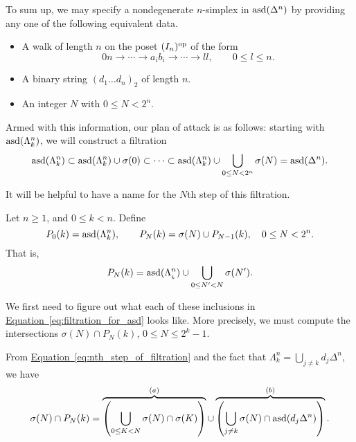 \documentclass[main.tex]{subfiles}
\begin{document}
To sum up, we may specify a nondegenerate $n$-simplex in $\mathrm{asd}(\Delta^{n})$ by providing any one of the following equivalent data.
\begin{itemize}
  \item A walk of length $n$ on the poset $(I_{n})^{\mathrm{op}}$ of the form
    \begin{equation*}
      0n \to \cdots \to a_{i}b_{i} \to \cdots \to ll,\qquad 0 \leq l \leq n.
    \end{equation*}

  \item A binary string $(d_{1}\ldots d_{n})_{2}$ of length $n$.

  \item An integer $N$ with $0 \leq N < 2^{n}$.
\end{itemize}

Armed with this information, our plan of attack is as follows: starting with $\mathrm{asd}(\Lambda^{n}_{k})$, we will construct a filtration
\begin{equation}
  \label{eq:filtration_for_asd}
  \mathrm{asd}(\Lambda^{n}_{k}) \subset \mathrm{asd}(\Lambda^{n}_{k}) \cup \sigma(0) \subset \cdots \subset \mathrm{asd}(\Lambda^{n}_{k}) \cup \bigcup_{0 \leq N < 2^{n}} \sigma(N) = \mathrm{asd}(\Delta^{n}).
\end{equation}

It will be helpful to have a name for the $N$th step of this filtration.

\begin{definition}
  Let $n \geq 1$, and $0 \leq k < n$. Define
  \begin{equation*}
    P_{0}(k) = \mathrm{asd}(\Lambda^{n}_{k}),\qquad P_{N}(k) = \sigma(N) \cup P_{N-1}(k),\quad 0 \leq N < 2^{n}.
  \end{equation*}
  That is,
  \begin{equation}
    \label{eq:nth_step_of_filtration}
    P_{N}(k) = \mathrm{asd}(\Lambda^{n}_{_{k}}) \cup \bigcup_{0 \leq N' < N} \sigma(N').
  \end{equation}
\end{definition}

We first need to figure out what each of these inclusions in \hyperref[eq:filtration_for_asd]{Equation~\ref*{eq:filtration_for_asd}} looks like. More precisely, we must compute the intersections $\sigma(N) \cap P_{N}(k)$, $0 \leq N \leq 2^{k}-1$.

From \hyperref[eq:nth_step_of_filtration]{Equation~\ref*{eq:nth_step_of_filtration}} and the fact that $\Lambda^{n}_{k} = \bigcup_{j \neq k} d_{j} \Delta^{n}$, we have
\begin{equation}
  \label{eq:intersection_parts_a_and_b}
  \sigma(N) \cap P_{N}(k) = \overbrace{\left( \bigcup_{0 \leq K < N} \sigma(N) \cap \sigma(K) \right)}^{(a)} \cup \overbrace{\left( \bigcup_{j \neq k} \sigma(N) \cap \mathrm{asd}(d_{j} \Delta^{n}) \right)}^{(b)}.
\end{equation}
\end{document}
